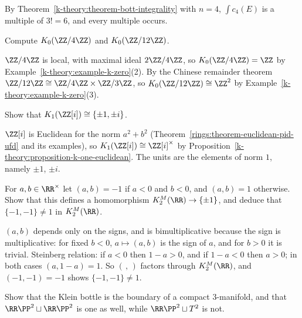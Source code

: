 \begin{solution}
By Theorem~\ref{k-theory:theorem-bott-integrality} with $n = 4$, $\int c_4(E)$ is a multiple of $3! = 6$, and every multiple occurs.
\end{solution}

\begin{exercise}\label{k-theory:exercise-k-zero-examples}
Compute $K_0(\ZZ/4\ZZ)$ and $K_0(\ZZ/12\ZZ)$.
\end{exercise}

\begin{solution}
$\ZZ/4\ZZ$ is local, with maximal ideal $2\ZZ/4\ZZ$, so $K_0(\ZZ/4\ZZ) = \ZZ$ by Example~\ref{k-theory:example-k-zero}(2). By the Chinese remainder theorem $\ZZ/12\ZZ \cong \ZZ/4\ZZ \times \ZZ/3\ZZ$, so
$K_0(\ZZ/12\ZZ) \cong \ZZ^2$ by Example~\ref{k-theory:example-k-zero}(3).
\end{solution}

\begin{exercise}\label{k-theory:exercise-k-one-gaussian}
Show that $K_1(\ZZ[i]) \cong \{\pm 1, \pm i\}$.
\end{exercise}

\begin{solution}
$\ZZ[i]$ is Euclidean for the norm $a^2 + b^2$ (Theorem~\ref{rings:theorem-euclidean-pid-ufd} and its examples), so $K_1(\ZZ[i]) \cong \ZZ[i]^\times$ by Proposition~\ref{k-theory:proposition-k-one-euclidean}.
The units are the elements of norm $1$, namely $\pm 1$, $\pm i$.
\end{solution}

\begin{exercise}\label{k-theory:exercise-sign-symbol}
For $a, b \in \RR^\times$ let $(a, b) = -1$ if $a < 0$ and $b < 0$, and $(a, b) = 1$ otherwise. Show that this defines a homomorphism $K_2^M(\RR) \to \{\pm 1\}$, and deduce that $\{-1, -1\} \neq 1$ in $K_2^M(\RR)$.
\end{exercise}

\begin{solution}
$(a, b)$ depends only on the signs, and is bimultiplicative because the sign is multiplicative: for fixed $b < 0$, $a \mapsto (a, b)$ is the sign of $a$, and for $b > 0$ it is trivial. Steinberg relation: if $a < 0$
then $1 - a > 0$, and if $1 - a < 0$ then $a > 0$; in both cases $(a, 1 - a) = 1$. So $(\,,\,)$ factors through $K_2^M(\RR)$, and $(-1, -1) = -1$ shows $\{-1, -1\} \neq 1$.
\end{solution}

\begin{exercise}\label{k-theory:exercise-klein-bottle}
Show that the Klein bottle is the boundary of a compact $3$-manifold, and that $\RR\PP^2 \sqcup \RR\PP^2$ is one as well, while $\RR\PP^2 \sqcup T^2$ is not.
\end{exercise}

